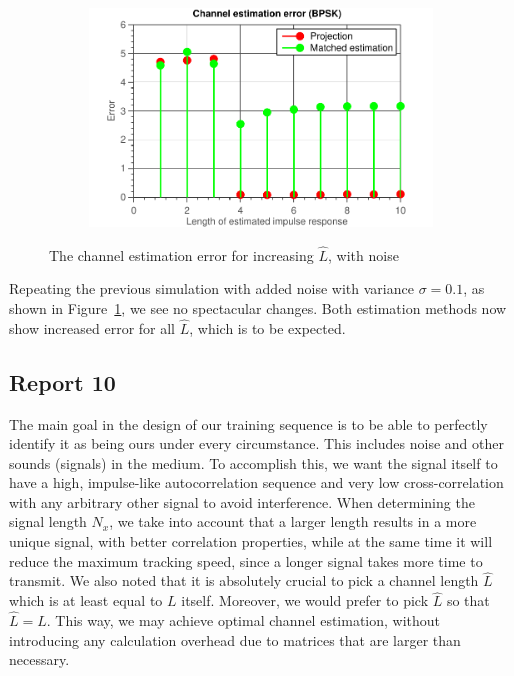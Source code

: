 \documentclass[11pt,titlepage]{report}
\begin{document}
\begin{figure}[H]
\begin{subfigure}{0.49\textwidth}
	\end{subfigure}
	\begin{subfigure}{0.49\textwidth}
		\includegraphics[width=\textwidth]{../../deliverable-7-resources/figures/ass-1/report-8-9-10/report-9-noise-0.1/ass-1-report-9-BPSK.pdf}
	\end{subfigure}
	\caption{The channel estimation error for increasing $\hat{L}$, with noise}
	\label{fig:rep9-error-noise}
\end{figure}

Repeating the previous simulation with added noise with variance $\sigma = 0.1$, as shown in Figure~\ref{fig:rep9-error-noise}, we see no spectacular changes. Both estimation methods now show increased error for all $\hat{L}$, which is to be expected. 

\subsection{Report 10}
The main goal in the design of our training sequence is to be able to perfectly identify it as being ours under every circumstance. This includes noise and other sounds (signals) in the medium. To accomplish this, we want the signal itself to have a high, impulse-like autocorrelation sequence and very low cross-correlation with any arbitrary other signal to avoid interference.
When determining the signal length $N_x$, we take into account that a larger length results in a more unique signal, with better correlation properties, while at the same time it will reduce the maximum tracking speed, since a longer signal takes more time to transmit.
We also noted that it is absolutely crucial to pick a channel length $\hat{L}$ which is at least equal to $L$ itself. Moreover, we would prefer to pick $\hat{L}$ so that $\hat{L} = L$. This way, we may achieve optimal channel estimation, without introducing any calculation overhead due to matrices that are larger than necessary.
\end{document}
